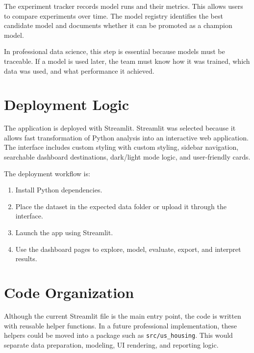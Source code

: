 The experiment tracker records model runs and their metrics. This allows users to compare experiments over time. The model registry identifies the best candidate model and documents whether it can be promoted as a champion model.

In professional data science, this step is essential because models must be traceable. If a model is used later, the team must know how it was trained, which data was used, and what performance it achieved.

\section{Deployment Logic}

The application is deployed with Streamlit. Streamlit was selected because it allows fast transformation of Python analysis into an interactive web application. The interface includes custom styling with custom styling, sidebar navigation, searchable dashboard destinations, dark/light mode logic, and user-friendly cards.

The deployment workflow is:
\begin{enumerate}
\item Install Python dependencies.
\item Place the dataset in the expected data folder or upload it through the interface.
\item Launch the app using Streamlit.
\item Use the dashboard pages to explore, model, evaluate, export, and interpret results.
\end{enumerate}

\section{Code Organization}

Although the current Streamlit file is the main entry point, the code is written with reusable helper functions. In a future professional implementation, these helpers could be moved into a package such as \texttt{src/us\_housing}. This would separate data preparation, modeling, UI rendering, and reporting logic.

